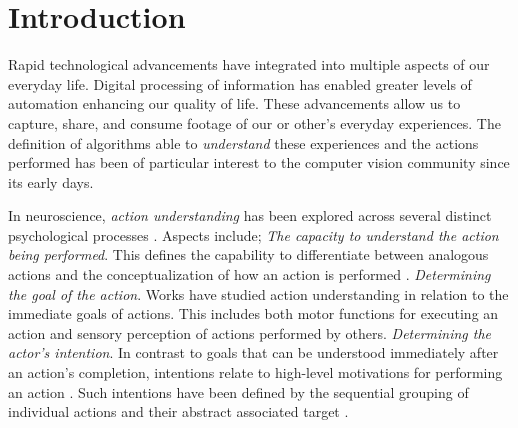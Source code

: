 \documentclass[smallextended,twocolumn,natbib]{svjour3}
\begin{document}



\section{Introduction}


Rapid technological advancements have integrated into multiple aspects of our everyday life. Digital processing of information has enabled greater levels of automation enhancing our quality of life. These advancements allow us to capture, share, and consume footage of our or other's everyday experiences. The definition of algorithms able to \emph{understand} these experiences and the actions performed has been of particular interest to the computer vision community since its early days. 



In neuroscience, \emph{action understanding} has been explored across several distinct psychological processes \citep{thompson2019conceptualizing}. Aspects include; \emph{The capacity to understand the action being performed}. This defines the capability to differentiate between analogous actions \citep{gallese1996action,jeannerod1994representing} and the conceptualization of how an action is performed \citep{spunt2011identifying}. \emph{Determining the goal of the action}. Works \citep{calvo2005action,kohler2002hearing,rizzolatti2001neurophysiological} have studied action understanding in relation to the immediate goals of actions. This includes both motor functions for executing an action and sensory perception of actions performed by others. \emph{Determining the actor's intention}. In contrast to goals that can be understood immediately after an action's completion, intentions relate to high-level motivations for performing an action \citep{kilner2011more}. Such intentions have been defined by the sequential grouping of individual actions \citep{fogassi2005parietal} and their abstract associated target \citep{uithol2011understanding}.
\end{document}
